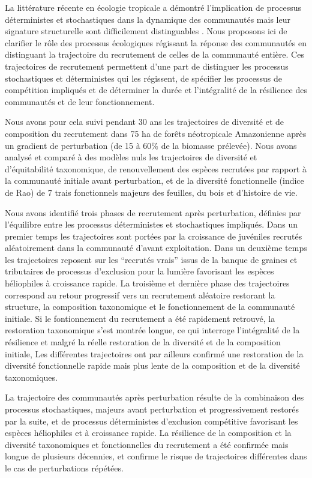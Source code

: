 \documentclass[
  11pt,
  french,
  A4paper,
  extrafontsizes,onecolumn,openright
  ]{memoir}
\begin{document}
La littérature récente en écologie tropicale a démontré l'implication de
processus déterministes et stochastiques dans la dynamique des
communautés mais leur signature structurelle sont difficilement
distinguables \autocites{Mouquet2003}{Chave2004}. Nous proposons ici de
clarifier le rôle des processus écologiques régissant la réponse des
communautés en distinguant la trajectoire du recrutement de celles de la
communauté entière. Ces trajectoires de recrutement permettent d'une
part de distinguer les processus stochastiques et déterministes qui les
régissent, de spécifier les processus de compétition impliqués et de
déterminer la durée et l'intégralité de la résilience des communautés et
de leur fonctionnement.

Nous avons pour cela suivi pendant 30 ans les trajectoires de diversité
et de composition du recrutement dans 75 ha de forêts néotropicale
Amazonienne après un gradient de perturbation (de 15 à 60\% de la
biomasse prélevée). Nous avons analysé et comparé à des modèles nuls les
trajectoires de diversité et d'équitabilité taxonomique, de
renouvellement des espèces recrutées par rapport à la communauté
initiale avant perturbation, et de la diversité fonctionnelle (indice de
Rao) de 7 trais fonctionnels majeurs des feuilles, du bois et d'histoire
de vie.

Nous avons identifié trois phases de recrutement après perturbation,
définies par l'équilibre entre les processus déterministes et
stochastiques impliqués. Dans un premier temps les trajectoires sont
portées par la croissance de juvéniles recrutés aléatoirement dans la
communauté d'avant exploitation. Dans un deuxième temps les trajectoires
reposent sur les ``recrutés vrais'' issus de la banque de graines et
tributaires de processus d'exclusion pour la lumière favorisant les
espèces héliophiles à croissance rapide. La troisième et dernière phase
des trajectoires correspond au retour progressif vers un recrutement
aléatoire restorant la structure, la composition taxonomique et le
fonctionnement de la communauté initiale. Si le fontionnement du
recrutement a été rapidement retrouvé, la restoration taxonomique s'est
montrée longue, ce qui interroge l'intégralité de la résilience et
malgré la réelle restoration de la diversité et de la composition
initiale, Les différentes trajectoires ont par ailleurs confirmé une
restoration de la diversité fonctionnelle rapide mais plus lente de la
composition et de la diversité taxonomiques.

La trajectoire des communautés après perturbation résulte de la
combinaison des processus stochastiques, majeurs avant perturbation et
progressivement restorés par la suite, et de processus déterministes
d'exclusion compétitive favorisant les espèces héliophiles et à
croissance rapide. La résilience de la composition et la diversité
taxonomiques et fonctionnelles du recrutement a été confirmée mais
longue de plusieurs décennies, et confirme le risque de trajectoires
différentes dans le cas de perturbations répétées.
\end{document}
